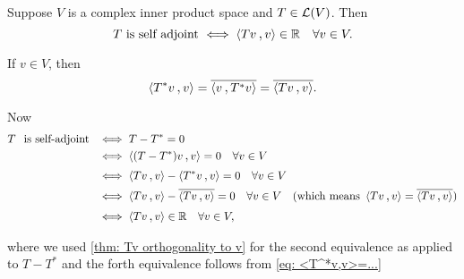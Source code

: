 \begin{thm}
  \label{thm: condition for T s. t. <Tv><v> is always real}
  Suppose $V$ is a complex inner product space and $T \in \mathcal{L}(V)$. Then
  \[
    T $ is self adjoint $ \iff \ip{Tv}{v} \in \real \quad \forall v \in V.
  \]
\end{thm}
\begin{prf}
  If $v \in V$, then
  \begin{equation}
    \label{eq: <T^*v,v>=...}
    \ip{T^*v}{v} = \overline{\ip{v}{T^*v}}=\overline{\ip{Tv}{v}}.
  \end{equation}

  Now
  \begin{equation}
    \begin{aligned}
      T \mytext{is self-adjoint}
      & \iff T-T^* = 0 \\
      & \iff \ip{(T-T^*)v}{v}=0 \quad \forall v \in V  \\
      & \iff \ip{Tv}{v} - \ip{T^*v}{v} = 0 \quad \forall v \in V  \\
      & \iff \ip{Tv}{v} - \overline{\ip{Tv}{v}} = 0 \quad \forall v  \in V \quad (\text{which means } \ip{Tv}{v} = \overline {\ip{Tv}{v}}) \\
      & \iff \ip{Tv}{v} \in \real \quad \forall v \in V,  \\
    \end{aligned}
  \end{equation}

  where we used \ref{thm: Tv orthogonality to v} for the second equivalence as applied to $T-T^*$ and the forth equivalence follows from \eqref{eq: <T^*v,v>=...}
\end{prf}

